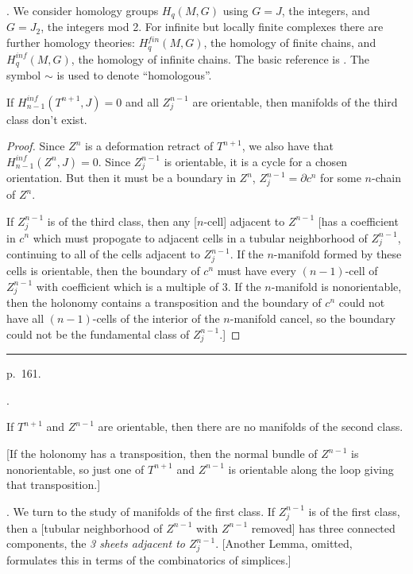 \documentclass{amsart}
\theoremstyle{plain}
\theoremstyle{definition}
\begin{document}
. We consider homology groups $H_q(M,G)$ using $G = J$, the
integers, and $G=J_2$, the integers mod 2. For infinite but
locally finite complexes there are further homology theories:
$H^{fin}_q(M,G)$, the homology of finite chains, and
$H^{inf}_q(M,G)$, the homology of infinite chains. The basic
reference is \cite[\S 9]{E}. The symbol $\sim$ is used to
denote ``homologous''.
\begin{lem}\label{Lemma 11} If $H^{inf}_{n-1}(T^{n+1},J) = 0$ and all
$Z^{n-1}_j$ are orientable, then manifolds of the third class
don't exist.
\end{lem}
\begin{proof} Since $Z^n$ is a deformation retract of $T^{n+1}$,
we also have that $H^{inf}_{n-1}(Z^n,J)=0$. Since $Z^{n-1}_j$ is
orientable, it is a cycle for a chosen orientation. But then it
must be a boundary in $Z^n$, $Z^{n-1}_j = \partial c^n$ for some
$n$-chain of $Z^n$.

If $Z^{n-1}_j$ is of the third class, then any [$n$-cell] adjacent
to $Z^{n-1}$ [has a coefficient in $c^n$ which must propogate to
adjacent cells in a tubular neighborhood of $Z^{n-1}_j$,
continuing to all of the cells adjacent to $Z^{n-1}_j$. If the
$n$-manifold formed by these cells is orientable, then the
boundary of $c^n$ must have every $(n-1)$-cell of $Z^{n-1}_j$
with coefficient which is a multiple of 3. If the $n$-manifold
is nonorientable, then the holonomy contains a transposition
and the boundary of $c^n$ could not have all $(n-1)$-cells of
the interior of the $n$-manifold cancel, so the boundary could
not be the fundamental class of $Z^{n-1}_j$.]
\end{proof}

\medskip
\hrule\smallskip
\noindent p.~161.
\medskip

.
\begin{lem}\label{Lemma 12} If $T^{n+1}$ and $Z^{n-1}$ are orientable,
then there are no manifolds of the second class.
\end{lem}
[If the holonomy has a transposition, then the normal bundle of
$Z^{n-1}$ is nonorientable, so just one of $T^{n+1}$ and $Z^{n-1}$
is orientable along the loop giving that transposition.]

. We turn to the study of manifolds of the first class. If
$Z^{n-1}_j$ is of the first class, then a [tubular neighborhood
of $Z^{n-1}$ with $Z^{n-1}$ removed] has three connected
components, the {\em 3 sheets adjacent to $Z^{n-1}_j$}.
[Another Lemma, omitted, formulates this in terms of the combinatorics of
simplices.]
\end{document}
